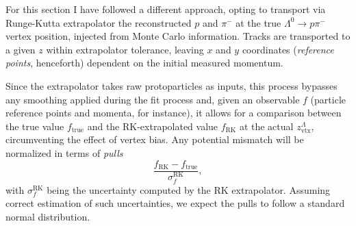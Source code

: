 For this section I have followed a different approach, opting to transport via Runge-Kutta extrapolator the reconstructed $p$ and $\pi^-$ at the true $\Lambda^0 \rightarrow p\pi^-$ vertex position, injected from Monte Carlo information.
Tracks are transported to a given $z$ within extrapolator tolerance, leaving $x$ and $y$ coordinates (\textit{reference points}, henceforth) dependent on the initial measured momentum.

Since the extrapolator takes raw protoparticles as inputs, this process bypasses any smoothing applied during the fit process and, given an observable $f$ (particle reference points and momenta, for instance), it allows for a comparison between the true value $f_\text{true}$ and the RK-extrapolated value $f_\text{RK}$ at the actual $z_\text{vtx}^\Lambda$, circumventing the effect of vertex bias.
Any potential mismatch will be normalized in terms of \textit{pulls}
\begin{equation}
	\frac{f_\text{RK} - f_\text{true}}{\sigma_f^\text{RK}},
\end{equation}
with $\sigma_f^\text{RK}$ being the uncertainty computed by the RK extrapolator.
Assuming correct estimation of such uncertainties, we expect the pulls to follow a standard normal distribution.

